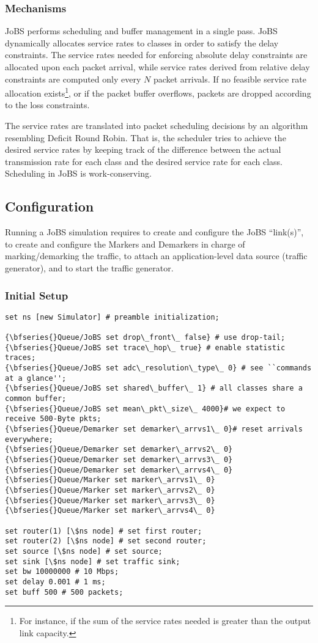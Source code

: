 \subsubsection{Mechanisms}
JoBS performs scheduling and buffer management in a 
single pass. JoBS dynamically allocates service rates to 
classes in order to satisfy the delay constraints. The service rates needed 
for enforcing absolute delay constraints 
are allocated upon each packet arrival, 
while service rates derived from 
relative delay constraints are computed only 
every $N$ packet arrivals. If no feasible 
service rate allocation exists\footnote{For instance, 
if the sum of the service 
rates needed is greater than the output link capacity.}, 
or if the packet buffer overflows, 
packets are dropped according to the loss constraints. 

The service rates are translated into packet scheduling decisions by 
an algorithm resembling Deficit Round Robin. That is, the scheduler 
tries to achieve the desired service rates by keeping track of the 
difference between the actual transmission rate for each class and the 
desired service rate for each class. Scheduling in JoBS is work-conserving.

\subsection{Configuration}
Running a JoBS simulation requires to create and configure the JoBS 
``link(s)'', to create and configure the Markers and Demarkers in charge 
of marking/demarking the traffic, to attach an application-level data 
source (traffic generator), and to start the traffic generator.

\subsubsection{Initial Setup}
\begin{verbatim}
set ns [new Simulator] # preamble initialization;

{\bfseries{}Queue/JoBS set drop\_front\_ false} # use drop-tail;
{\bfseries{}Queue/JoBS set trace\_hop\_ true} # enable statistic traces;
{\bfseries{}Queue/JoBS set adc\_resolution\_type\_ 0} # see ``commands at a glance'';
{\bfseries{}Queue/JoBS set shared\_buffer\_ 1} # all classes share a common buffer;
{\bfseries{}Queue/JoBS set mean\_pkt\_size\_ 4000}# we expect to receive 500-Byte pkts;
{\bfseries{}Queue/Demarker set demarker\_arrvs1\_ 0}# reset arrivals everywhere;
{\bfseries{}Queue/Demarker set demarker\_arrvs2\_ 0}
{\bfseries{}Queue/Demarker set demarker\_arrvs3\_ 0}
{\bfseries{}Queue/Demarker set demarker\_arrvs4\_ 0}
{\bfseries{}Queue/Marker set marker\_arrvs1\_ 0}
{\bfseries{}Queue/Marker set marker\_arrvs2\_ 0}
{\bfseries{}Queue/Marker set marker\_arrvs3\_ 0}
{\bfseries{}Queue/Marker set marker\_arrvs4\_ 0}

set router(1) [\$ns node] # set first router;
set router(2) [\$ns node] # set second router;
set source [\$ns node] # set source;
set sink [\$ns node] # set traffic sink;
set bw 10000000 # 10 Mbps;
set delay 0.001 # 1 ms;
set buff 500 # 500 packets;
\end{verbatim}

